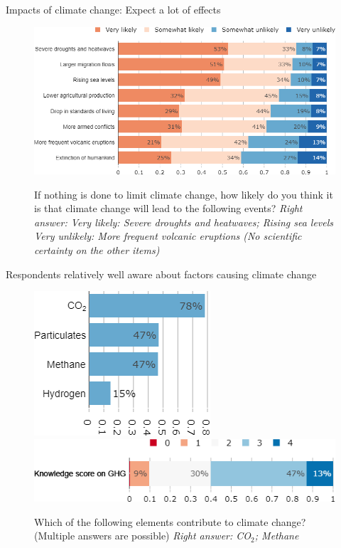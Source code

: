 \begin{framefont}{\small}
\begin{frame}{Impacts of climate change: Expect a lot of effects}%
\begin{figure}[h!]
\centering
\caption{If nothing is done to limit climate change, how likely do you think it is that climate change will lead to the following events?
\newline\footnotesize{\textit{Right answer: Very likely: Severe droughts and heatwaves; Rising sea levels \\ \quad \quad \quad \quad \quad \quad Very unlikely: More frequent volcanic eruptions (No scientific certainty on the other items)}}}
\includegraphics[width=.74\paperwidth]{../figures/FR/CC_impacts_FR.png} \\
\end{figure}
\end{frame}

\begin{frame}{Respondents relatively well aware about factors causing climate change}%
	\begin{figure}[h!]
	\centering
	\caption{Which of the following elements contribute to climate change? (Multiple answers are possible) \newline \footnotesize{\textit{Right answer: CO$_\text{2}$; Methane}}}
	\centering
	\includegraphics[width=.30\paperwidth]{../figures/FR/GHG_FR.png}
	\vspace{.2cm} \\
	\includegraphics[width=.61\paperwidth]{../figures/FR/score_GHG_FR.png}
	

\end{figure}
\end{frame}
\end{framefont}
